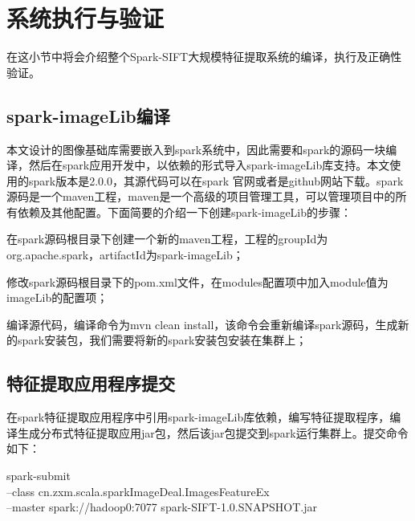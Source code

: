 \section{系统执行与验证}
在这小节中将会介绍整个Spark-SIFT大规模特征提取系统的编译，执行及正确性验证。
\subsection{spark-imageLib编译}
本文设计的图像基础库需要嵌入到spark系统中，因此需要和spark的源码一块编译，然后在spark应用开发中，以依赖的形式导入spark-imageLib库支持。本文使用的spark版本是2.0.0，其源代码可以在spark 官网或者是github网站下载。spark源码是一个maven工程，maven是一个高级的项目管理工具，可以管理项目中的所有依赖及其他配置。下面简要的介绍一下创建spark-imageLib的步骤：
\begin{compactenum}
\item 在spark源码根目录下创建一个新的maven工程，工程的groupId为org.apache.spark，artifactId为spark-imageLib；
\item 修改spark源码根目录下的pom.xml文件，在modules配置项中加入module值为imageLib的配置项；
\item 编译源代码，编译命令为mvn clean install，该命令会重新编译spark源码，生成新的spark安装包，我们需要将新的spark安装包安装在集群上；
\end{compactenum}
\subsection{特征提取应用程序提交}
在spark特征提取应用程序中引用spark-imageLib库依赖，编写特征提取程序，编译生成分布式特征提取应用jar包，然后该jar包提交到spark运行集群上。提交命令如下：
\begin{code}
spark-submit
\\--class cn.zxm.scala.sparkImageDeal.ImagesFeatureEx
\\--master spark://hadoop0:7077
spark-SIFT-1.0.SNAPSHOT.jar
\end{code}
